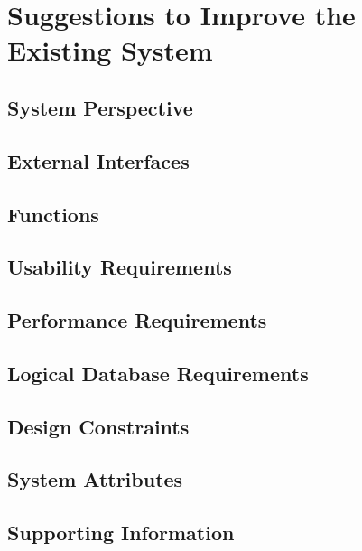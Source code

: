 \chapter{Suggestions to Improve the Existing System}

\section{System Perspective}

\section{External Interfaces}

\section{Functions}

\section{Usability Requirements}

\section{Performance Requirements}

\section{Logical Database Requirements}

\section{Design Constraints}

\section{System Attributes}

\section{Supporting Information}